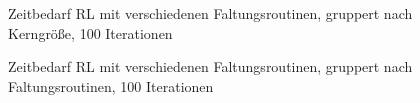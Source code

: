 \documentclass[a4paper,12pt]{article}
\begin{document}
\begin{figure}[htbp]
\caption{Zeitbedarf RL mit verschiedenen Faltungsroutinen, gruppert nach
Kerngröße, 100 Iterationen}%
\label{figure_zeit_rl}
\end{figure}
 
\begin{figure}[htbp]
\caption{Zeitbedarf RL mit verschiedenen Faltungsroutinen, gruppert nach
Faltungsroutinen, 100 Iterationen}%
\label{figure_zeit_rl_umgruppiert}
\end{figure}
 
\end{document}

